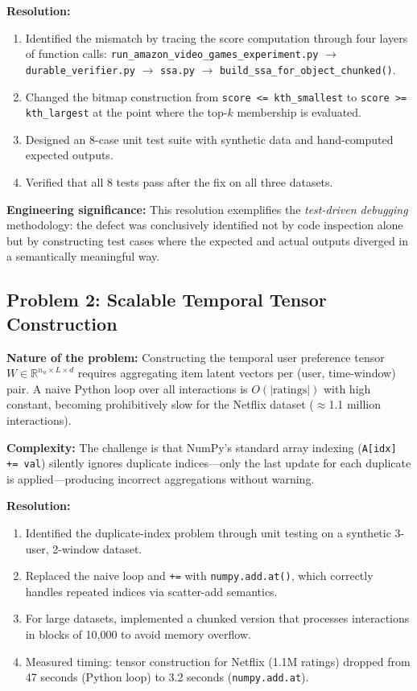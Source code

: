 \textbf{Resolution:}
\begin{enumerate}
  \item Identified the mismatch by tracing the score computation through four layers of function calls: \texttt{run\_amazon\_video\_games\_experiment.py} $\rightarrow$ \texttt{durable\_verifier.py} $\rightarrow$ \texttt{ssa.py} $\rightarrow$ \texttt{build\_ssa\_for\_object\_chunked()}.
  \item Changed the bitmap construction from \texttt{score <= kth\_smallest} to \texttt{score >= kth\_largest} at the point where the top-$k$ membership is evaluated.
  \item Designed an 8-case unit test suite with synthetic data and hand-computed expected outputs.
  \item Verified that all 8 tests pass after the fix on all three datasets.
\end{enumerate}

\textbf{Engineering significance:} This resolution exemplifies the \textit{test-driven debugging} methodology: the defect was conclusively identified not by code inspection alone but by constructing test cases where the expected and actual outputs diverged in a semantically meaningful way.

\subsection{Problem 2: Scalable Temporal Tensor Construction}

\textbf{Nature of the problem:} Constructing the temporal user preference tensor $W \in \mathbb{R}^{n_u \times L \times d}$ requires aggregating item latent vectors per (user, time-window) pair. A naive Python loop over all interactions is $O(|\text{ratings}|)$ with high constant, becoming prohibitively slow for the Netflix dataset ($\approx$1.1 million interactions).

\textbf{Complexity:} The challenge is that NumPy's standard array indexing (\texttt{A[idx] += val}) silently ignores duplicate indices---only the last update for each duplicate is applied---producing incorrect aggregations without warning.

\textbf{Resolution:}
\begin{enumerate}
  \item Identified the duplicate-index problem through unit testing on a synthetic 3-user, 2-window dataset.
  \item Replaced the naive loop and \texttt{+=} with \texttt{numpy.add.at()}, which correctly handles repeated indices via scatter-add semantics.
  \item For large datasets, implemented a chunked version that processes interactions in blocks of 10{,}000 to avoid memory overflow.
  \item Measured timing: tensor construction for Netflix (1.1M ratings) dropped from 47 seconds (Python loop) to 3.2 seconds (\texttt{numpy.add.at}).
\end{enumerate}

